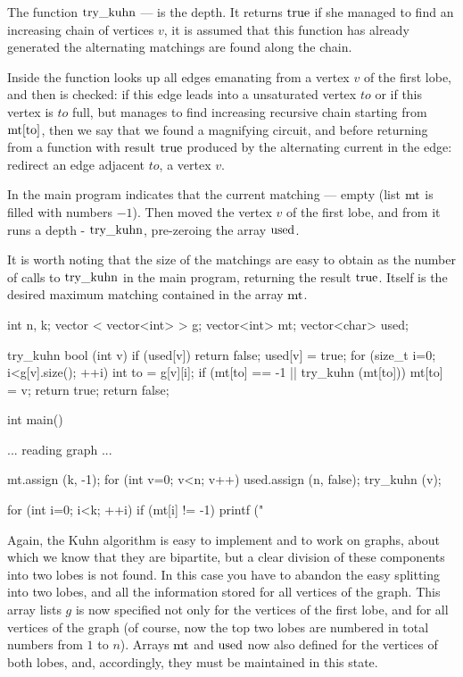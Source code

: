 The function $\rm try\_kuhn$ --- is the depth. It returns $\rm true$ if she managed to find an increasing chain of vertices $v$, it is assumed that this function has already generated the alternating matchings are found along the chain.

Inside the function looks up all edges emanating from a vertex $v$ of the first lobe, and then is checked: if this edge leads into a unsaturated vertex $to$ or if this vertex is $to$ full, but manages to find increasing recursive chain starting from $\rm mt[to]$, then we say that we found a magnifying circuit, and before returning from a function with result $\rm true$ produced by the alternating current in the edge: redirect an edge adjacent $to$, a vertex $v$.

In the main program indicates that the current matching --- empty (list $\rm mt$ is filled with numbers $-1$). Then moved the vertex $v$ of the first lobe, and from it runs a depth - $\rm try\_kuhn$, pre-zeroing the array $\rm used$.

It is worth noting that the size of the matchings are easy to obtain as the number of calls to $\rm try\_kuhn$ in the main program, returning the result $\rm true$. Itself is the desired maximum matching contained in the array $\rm mt$.

\code
int n, k;
vector < vector<int> > g;
vector<int> mt;
vector<char> used;

try_kuhn bool (int v) {
if (used[v]) return false;
used[v] = true;
for (size_t i=0; i<g[v].size(); ++i) {
int to = g[v][i];
if (mt[to] == -1 || try_kuhn (mt[to])) {
mt[to] = v;
return true;
}
}
return false;
}

int main() {
... reading graph ...

mt.assign (k, -1);
for (int v=0; v<n; v++) {
used.assign (n, false);
try_kuhn (v);
}

for (int i=0; i<k; ++i)
if (mt[i] != -1)
printf ("%
}
\endcode

Again, the Kuhn algorithm is easy to implement and to work on graphs, about which we know that they are bipartite, but a clear division of these components into two lobes is not found. In this case you have to abandon the easy splitting into two lobes, and all the information stored for all vertices of the graph. This array lists $g$ is now specified not only for the vertices of the first lobe, and for all vertices of the graph (of course, now the top two lobes are numbered in total numbers from $1$ to $n$). Arrays $\rm mt$ and $\rm used$ now also defined for the vertices of both lobes, and, accordingly, they must be maintained in this state.


